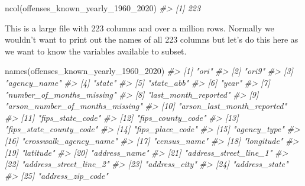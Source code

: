 \documentclass[
]{krantz}
\makeatletter
\newenvironment{Shaded}{\begin{snugshade}}{\end{snugshade}}
\newcommand{\CommentTok}[1]{\textcolor[rgb]{0.37,0.37,0.37}{\textit{#1}}}
\newcommand{\FunctionTok}[1]{\textcolor[rgb]{0,0,0}{#1}}
\newcommand{\NormalTok}[1]{#1}
\newenvironment{kframe}{%
\medskip{}
\setlength{\fboxsep}{.8em}
 \def\at@end@of@kframe{}%
 \ifinner\ifhmode%
  \def\at@end@of@kframe{\end{minipage}}%
  \begin{minipage}{\columnwidth}%
 \fi\fi%
 \def\FrameCommand##1{\hskip\@totalleftmargin \hskip-\fboxsep
 \colorbox{shadecolor}{##1}\hskip-\fboxsep
     \hskip-\linewidth \hskip-\@totalleftmargin \hskip\columnwidth}%
 \MakeFramed {\advance\hsize-\width
   \@totalleftmargin\z@ \linewidth\hsize
   \@setminipage}}%
 {\par\unskip\endMakeFramed%
 \at@end@of@kframe}
\renewenvironment{Shaded}{\begin{kframe}}{\end{kframe}}
\makeatother
\begin{document}
\begin{Shaded}
\begin{Highlighting}[]
\FunctionTok{ncol}\NormalTok{(offenses\_known\_yearly\_1960\_2020)}
\CommentTok{\#\textgreater{} [1] 223}
\end{Highlighting}
\end{Shaded}

This is a large file with 223 columns and over a million rows. Normally we wouldn't want to print out the names of all 223 columns but let's do this here as we want to know the variables available to subset.

\begin{Shaded}
\begin{Highlighting}[]
\FunctionTok{names}\NormalTok{(offenses\_known\_yearly\_1960\_2020)}
\CommentTok{\#\textgreater{}   [1] "ori"                             }
\CommentTok{\#\textgreater{}   [2] "ori9"                            }
\CommentTok{\#\textgreater{}   [3] "agency\_name"                     }
\CommentTok{\#\textgreater{}   [4] "state"                           }
\CommentTok{\#\textgreater{}   [5] "state\_abb"                       }
\CommentTok{\#\textgreater{}   [6] "year"                            }
\CommentTok{\#\textgreater{}   [7] "number\_of\_months\_missing"        }
\CommentTok{\#\textgreater{}   [8] "last\_month\_reported"             }
\CommentTok{\#\textgreater{}   [9] "arson\_number\_of\_months\_missing"  }
\CommentTok{\#\textgreater{}  [10] "arson\_last\_month\_reported"       }
\CommentTok{\#\textgreater{}  [11] "fips\_state\_code"                 }
\CommentTok{\#\textgreater{}  [12] "fips\_county\_code"                }
\CommentTok{\#\textgreater{}  [13] "fips\_state\_county\_code"          }
\CommentTok{\#\textgreater{}  [14] "fips\_place\_code"                 }
\CommentTok{\#\textgreater{}  [15] "agency\_type"                     }
\CommentTok{\#\textgreater{}  [16] "crosswalk\_agency\_name"           }
\CommentTok{\#\textgreater{}  [17] "census\_name"                     }
\CommentTok{\#\textgreater{}  [18] "longitude"                       }
\CommentTok{\#\textgreater{}  [19] "latitude"                        }
\CommentTok{\#\textgreater{}  [20] "address\_name"                    }
\CommentTok{\#\textgreater{}  [21] "address\_street\_line\_1"           }
\CommentTok{\#\textgreater{}  [22] "address\_street\_line\_2"           }
\CommentTok{\#\textgreater{}  [23] "address\_city"                    }
\CommentTok{\#\textgreater{}  [24] "address\_state"                   }
\CommentTok{\#\textgreater{}  [25] "address\_zip\_code"                }

\end{Highlighting}
\end{Shaded}
\end{document}
